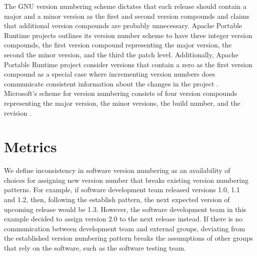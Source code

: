 \documentclass[conference]{IEEEtran}
\begin{document}

The GNU version numbering scheme dictates that each release should contain a major and a minor version as the first and second version compounds and claims that additional version compounds are probably unnecessary\cite{GNUVersionNumbering}.
Apache Portable Runtime projects outlines its version number scheme to have three integer version compounds, the first version compound representing the major version, the second the minor version, and the third the patch level.
Additionally, Apache Portable Runtime project consider versions that contain a zero as the first version compound as a special case where incrementing version numbers does communicate consistent information about the changes in the project \cite{ApacheVersionNumbering}.
Microsoft's scheme for version numbering consists of four version compounds representing the major version, the minor versions, the build number, and the revision \cite{MSVersionNumbering}.

\section{Metrics}

We define inconsistency in software version numbering as an availability of choices for assigning new version number that breaks existing version numbering patterns. 
For example, if software development team released versions 1.0, 1.1 and 1.2, then, following the establish pattern, the next expected version of upcoming release would be 1.3. 
However,  the software development team in this example decided to assign version 2.0 to the next release instead.
If there is no communication between development team and external groups, deviating from the established version numbering pattern breaks the assumptions of other groups that rely on the software, such as the software testing team.
\end{document}
